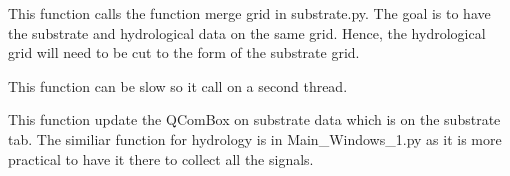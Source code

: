 \documentclass[letterpaper,10pt,english]{sphinxmanual}
\begin{document}
\begin{fulllineitems}

\begin{fulllineitems}
\label{\detokenize{index:src_GUI.hydro_GUI_2.SubstrateW.send_merge_grid}}
This function calls the function merge grid in substrate.py. The goal is to have the substrate and hydrological
data on the same grid. Hence, the hydrological grid will need to be cut to the form of the substrate grid.

This function can be slow so it call on a second thread.

\end{fulllineitems}


\begin{fulllineitems}
\label{\detokenize{index:src_GUI.hydro_GUI_2.SubstrateW.update_sub_hdf5_name}}
This function update the QComBox on substrate data which is on the substrate tab. The similiar function
for hydrology is in Main\_Windows\_1.py as it is more practical to have it there to collect all the signals.

\end{fulllineitems}


\end{fulllineitems}

\end{document}
